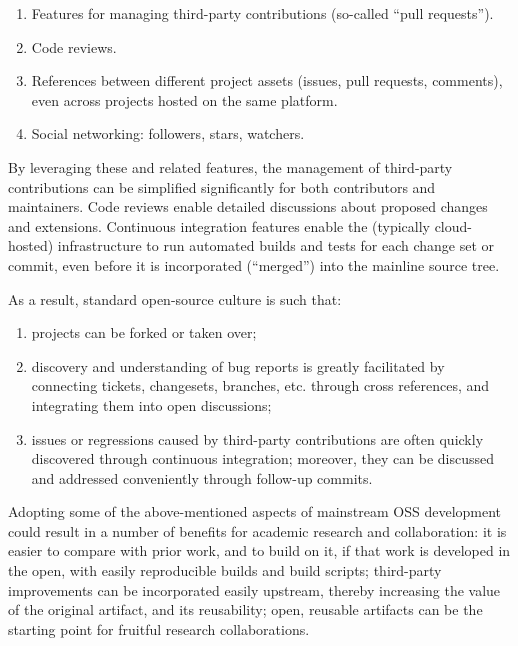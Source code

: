 \documentclass[acmtocl]{acmtrans2m}
\begin{document}
\begin{enumerate}

\item Features for managing third-party
contributions (so-called ``pull requests'').

\item Code reviews.

\item References between different project assets (issues, pull
requests, comments), even across projects hosted on the same platform.

\item Social networking: followers, stars, watchers.

\end{enumerate}

By leveraging these and related features, the management of third-party
contributions can be simplified significantly for both contributors and
maintainers. Code reviews enable detailed discussions about proposed changes
and extensions. Continuous integration features enable the (typically cloud-
hosted) infrastructure to run automated builds and tests for each change set
or commit, even before it is incorporated (``merged'') into the mainline
source tree.

As a result, standard open-source culture is such that:

\begin{enumerate}

\item projects can be forked or taken over;

\item discovery and understanding of bug reports is greatly facilitated by
connecting tickets, changesets, branches, etc. through cross references, and
integrating them into open discussions;

\item issues or regressions caused by third-party contributions are often
quickly discovered through continuous integration; moreover, they can be
discussed and addressed conveniently through follow-up commits.

\end{enumerate}

Adopting some of the above-mentioned aspects of mainstream OSS development
could result in a number of benefits for academic research and collaboration:
it is easier to compare with prior work, and to build on it, if that work is
developed in the open, with easily reproducible builds and build scripts;
third-party improvements can be incorporated easily upstream, thereby
increasing the value of the original artifact, and its reusability; open,
reusable artifacts can be the starting point for fruitful research
collaborations.
\end{document}
